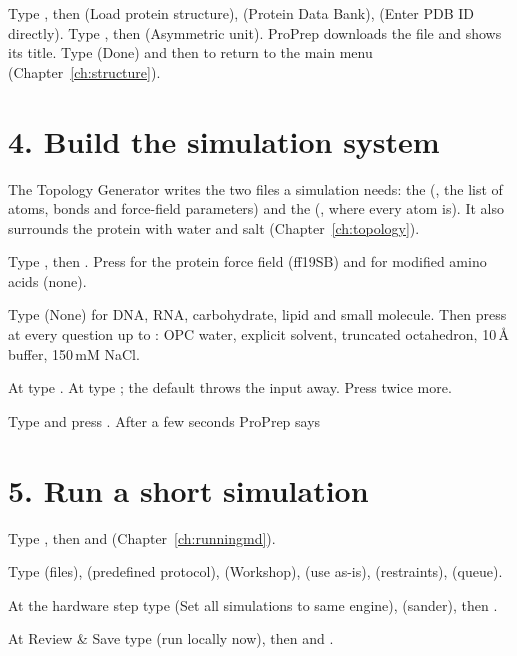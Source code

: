Type , then  (Load protein structure),  (Protein Data
Bank),  (Enter PDB ID directly). Type , then 
(Asymmetric unit). ProPrep downloads the file and shows its title. Type
 (Done) and then  to return to the main menu
(Chapter~\ref{ch:structure}).

\section*{4. Build the simulation system}

The Topology Generator writes the two files a simulation needs: the
 (, the list of atoms, bonds and force-field
parameters) and the  (, where every atom is). It
also surrounds the protein with water and salt (Chapter~\ref{ch:topology}).

\begin{steps}
  \item Type , then . Press  for the protein force
        field (ff19SB) and for modified amino acids (none).
  \item Type  (None) for DNA, RNA, carbohydrate, lipid and small
        molecule. Then press  at every question up to
        : OPC water, explicit solvent, truncated
        octahedron, 10\,\AA{} buffer, 150\,mM NaCl.
  \item At  type . At
         type
        ; the default  throws the input away. Press 
        twice more.
  \item Type  and press . After a few seconds ProPrep says
\end{steps}

\section*{5. Run a short simulation}

Type , then  and  (Chapter~\ref{ch:runningmd}).
\begin{steps}
  \item Type  (files),  (predefined protocol),  (Workshop),
         (use as-is),  (restraints),  (queue).
  \item At the hardware step type  (Set all simulations to same
        engine),  (sander), then .
  \item At Review \& Save type  (run locally now), then  and
        .
\end{steps}


